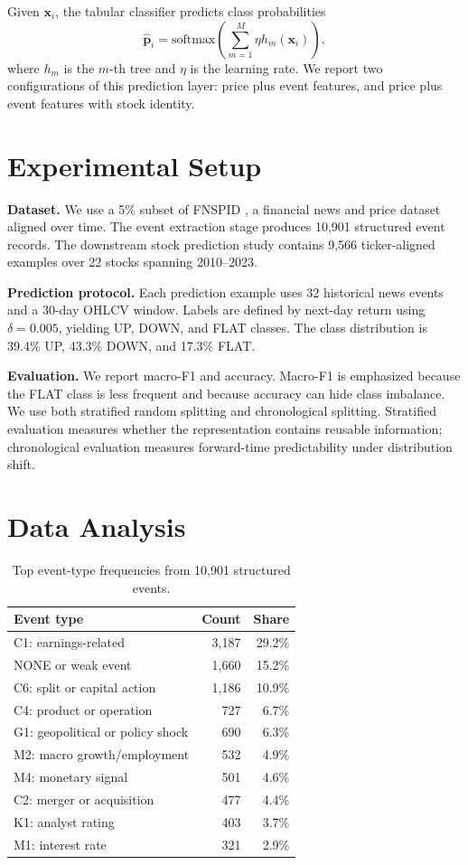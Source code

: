 \documentclass[sigconf,review]{acmart}
\begin{document}
Given $\mathbf{x}_i$, the tabular classifier predicts class probabilities
\begin{equation}
\hat{\mathbf{p}}_i=\mathrm{softmax}\left(\sum_{m=1}^{M}\eta h_m(\mathbf{x}_i)\right),
\end{equation}
where $h_m$ is the $m$-th tree and $\eta$ is the learning rate. We report two configurations of this prediction layer: price plus event features, and price plus event features with stock identity.

\section{Experimental Setup}

\textbf{Dataset.} We use a 5\% subset of FNSPID \cite{dong2024fnspid}, a financial news and price dataset aligned over time. The event extraction stage produces 10{,}901 structured event records. The downstream stock prediction study contains 9{,}566 ticker-aligned examples over 22 stocks spanning 2010--2023.

\textbf{Prediction protocol.} Each prediction example uses 32 historical news events and a 30-day OHLCV window. Labels are defined by next-day return using $\delta=0.005$, yielding UP, DOWN, and FLAT classes. The class distribution is 39.4\% UP, 43.3\% DOWN, and 17.3\% FLAT.

\textbf{Evaluation.} We report macro-F1 and accuracy. Macro-F1 is emphasized because the FLAT class is less frequent and because accuracy can hide class imbalance. We use both stratified random splitting and chronological splitting. Stratified evaluation measures whether the representation contains reusable information; chronological evaluation measures forward-time predictability under distribution shift.

\section{Data Analysis}

\begin{table}[t]
\caption{Top event-type frequencies from 10{,}901 structured events.}
\label{tab:event_dist}
\centering
\small
\begin{tabular}{lrr}
\toprule
Event type & Count & Share \\
\midrule
C1: earnings-related & 3{,}187 & 29.2\% \\
NONE or weak event & 1{,}660 & 15.2\% \\
C6: split or capital action & 1{,}186 & 10.9\% \\
C4: product or operation & 727 & 6.7\% \\
G1: geopolitical or policy shock & 690 & 6.3\% \\
M2: macro growth/employment & 532 & 4.9\% \\
M4: monetary signal & 501 & 4.6\% \\
C2: merger or acquisition & 477 & 4.4\% \\
K1: analyst rating & 403 & 3.7\% \\
M1: interest rate & 321 & 2.9\% \\
\bottomrule
\end{tabular}
\end{table}
\end{document}

